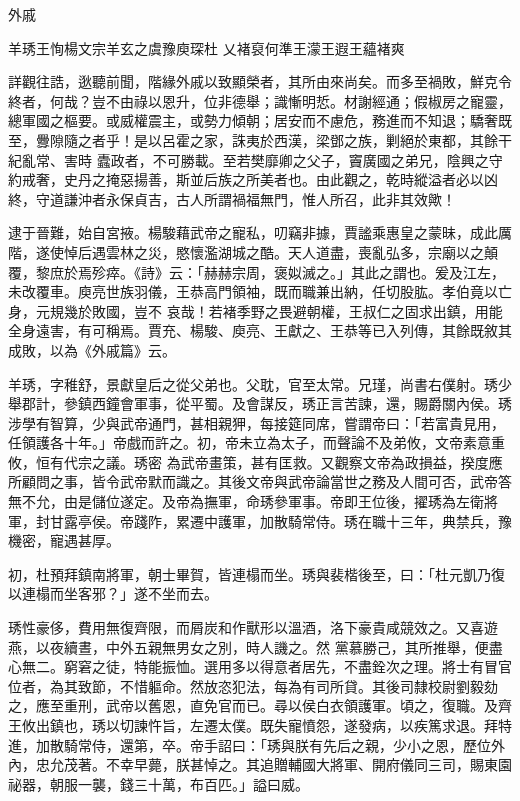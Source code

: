
\begin{pinyinscope}

 外戚



 羊琇王恂楊文宗羊玄之虞豫庾琛杜
 乂褚裒何準王濛王遐王蘊褚爽



 詳觀往誥，逖聽前聞，階緣外戚以致顯榮者，其所由來尚矣。而多至禍敗，鮮克令終者，何哉？豈不由祿以恩升，位非德舉；識慚明悊。材謝經通；假椒房之寵靈，總軍國之樞要。或威權震主，或勢力傾朝；居安而不慮危，務進而不知退；驕奢既至，釁隙隨之者乎！是以呂霍之家，誅夷於西漢，梁鄧之族，剿絕於東都，其餘干紀亂常、害時
 蠹政者，不可勝載。至若樊靡卿之父子，竇廣國之弟兄，陰興之守約戒奢，史丹之掩惡揚善，斯並后族之所美者也。由此觀之，乾時縱溢者必以凶終，守道謙沖者永保貞吉，古人所謂禍福無門，惟人所召，此非其效歟！



 逮于晉難，始自宮掖。楊駿藉武帝之寵私，叨竊非據，賈謐乘惠皇之蒙昧，成此厲階，遂使悼后遇雲林之災，愍懷濫湖城之酷。天人道盡，喪亂弘多，宗廟以之顛覆，黎庶於焉殄瘁。《詩》云：「赫赫宗周，褒姒滅之。」其此之謂也。爰及江左，未改覆車。庾亮世族羽儀，王恭高門領袖，既而職兼出納，任切股肱。孝伯竟以亡身，元規幾於敗國，豈不
 哀哉！若褚季野之畏避朝權，王叔仁之固求出鎮，用能全身遠害，有可稱焉。賈充、楊駿、庾亮、王獻之、王恭等已入列傳，其餘既敘其成敗，以為《外戚篇》云。



 羊琇，字稚舒，景獻皇后之從父弟也。父耽，官至太常。兄瑾，尚書右僕射。琇少舉郡計，參鎮西鐘會軍事，從平蜀。及會謀反，琇正言苦諫，還，賜爵關內侯。琇涉學有智算，少與武帝通門，甚相親狎，每接筵同席，嘗謂帝曰：「若富貴見用，任領護各十年。」帝戲而許之。初，帝未立為太子，而聲論不及弟攸，文帝素意重攸，恒有代宗之議。琇密
 為武帝畫策，甚有匡救。又觀察文帝為政損益，揆度應所顧問之事，皆令武帝默而識之。其後文帝與武帝論當世之務及人間可否，武帝答無不允，由是儲位遂定。及帝為撫軍，命琇參軍事。帝即王位後，擢琇為左衛將軍，封甘露亭侯。帝踐阼，累遷中護軍，加散騎常侍。琇在職十三年，典禁兵，豫機密，寵遇甚厚。



 初，杜預拜鎮南將軍，朝士畢賀，皆連榻而坐。琇與裴楷後至，曰：「杜元凱乃復以連榻而坐客邪？」遂不坐而去。



 琇性豪侈，費用無復齊限，而屑炭和作獸形以溫酒，洛下豪貴咸競效之。又喜遊燕，以夜續晝，中外五親無男女之別，時人譏之。然
 黨慕勝己，其所推舉，便盡心無二。窮窘之徒，特能振恤。選用多以得意者居先，不盡銓次之理。將士有冒官位者，為其致節，不惜軀命。然放恣犯法，每為有司所貸。其後司隸校尉劉毅劾之，應至重刑，武帝以舊恩，直免官而已。尋以侯白衣領護軍。頃之，復職。及齊王攸出鎮也，琇以切諫忤旨，左遷太僕。既失寵憤怨，遂發病，以疾篤求退。拜特進，加散騎常侍，還第，卒。帝手詔曰：「琇與朕有先后之親，少小之恩，歷位外內，忠允茂著。不幸早薨，朕甚悼之。其追贈輔國大將軍、開府儀同三司，賜東園祕器，朝服一襲，錢三十萬，布百匹。」謚曰威。




\end{pinyinscope}
